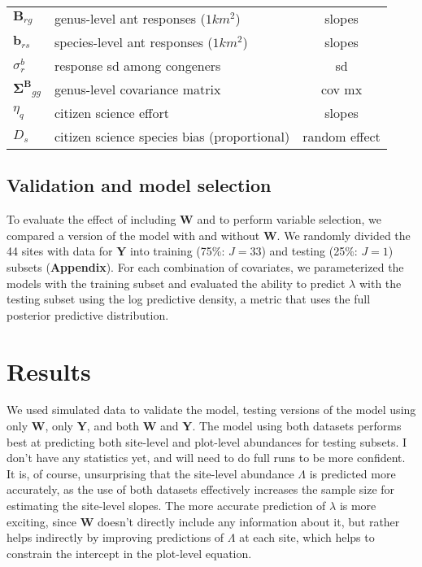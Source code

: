 \documentclass[10pt,a4paper,draft]{article}
\begin{document}
\begin{center}
\begin{tabular}{ l l c }
    $\mathbf{B}_{rg}$ & genus-level ant responses ($1 km^2$) & slopes \\
    $\mathbf{b}_{rs}$ & species-level ant responses ($1 km^2$) & slopes \\
    $\sigma^b_{r}$ & response sd among congeners & sd \\
    $\mathbf{\Sigma^B}_{gg}$ & genus-level covariance matrix & cov mx \\
    $\eta_{q}$ & citizen science effort & slopes \\
    $D_{s}$ & citizen science species bias (proportional) & random effect \\
  \end{tabular}
\end{center}

\subsection{Validation and model selection}
To evaluate the effect of including \textbf{W} and to perform variable selection, we compared a version of the model with and without \textbf{W}. We randomly divided the 44 sites with data for \textbf{Y} into training (75\%: $J=33$) and testing (25\%: $J=1$) subsets (\textbf{Appendix}). For each combination of covariates, we parameterized the models with the training subset and evaluated the ability to predict $\lambda$ with the testing subset using the log predictive density, a metric that uses the full posterior predictive distribution. 





\section{Results}
We used simulated data to validate the model, testing versions of the model using only \textbf{W}, only \textbf{Y}, and both \textbf{W} and \textbf{Y}. The model using both datasets performs best at predicting both site-level and plot-level abundances for testing subsets. I don't have any statistics yet, and will need to do full runs to be more confident. It is, of course, unsurprising that the site-level abundance $\Lambda$ is predicted more accurately, as the use of both datasets effectively increases the sample size for estimating the site-level slopes. The more accurate prediction of $\lambda$ is more exciting, since \textbf{W} doesn't directly include any information about it, but rather helps indirectly by improving predictions of $\Lambda$ at each site, which helps to constrain the intercept in the plot-level equation. 
\end{document}
